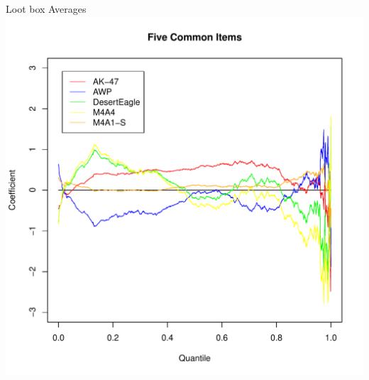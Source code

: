\documentclass[bigger]{beamer}
\begin{document}
\begin{frame}[label=sec-1-42]{Loot box Averages}
\includegraphics[width=.9\linewidth]{../Plots/QuantRegGuns.pdf}
\end{frame}
\end{document}
